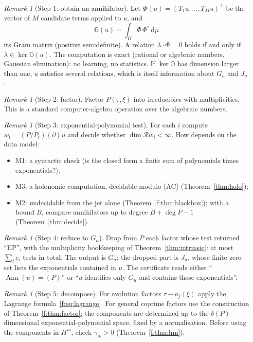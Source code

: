 \documentclass[11pt]{article}
\theoremstyle{plain}
\theoremstyle{definition}
\theoremstyle{remark}
\newtheorem{remark}[theorem]{Remark}
\newcommand{\ring}{\mathcal{R}}            %
\DeclareMathOperator{\Ann}{Ann}             %
\newcommand{\dd}{\,\mathrm{d}}
\DeclareMathOperator{\dimc}{dim}
\newenvironment{aside}[1]{\begin{remark}[#1]}{\end{remark}}
\begin{document}
\begin{aside}{Step 1: obtain an annihilator}
Let $\Phi(u)=(T_1u,\dots,T_Mu)^{\top}$ be the vector of $M$ candidate terms applied to $u$, and
\[
\mathbb G(u)=\int_\Omega\Phi\,\Phi^{*}\dd\mu
\]
its Gram matrix (positive semidefinite). A relation $\lambda\cdot\Phi=0$ holds if and only if $\lambda\in\ker\mathbb G(u)$. The computation is exact (rational or algebraic numbers, Gaussian elimination): no learning, no statistics. If $\ker\mathbb G$ has dimension larger than one, $u$ satisfies several relations, which is itself information about $G_u$ and $J_u$.
\end{aside}

\begin{aside}{Step 2: factor}
Factor $P(\tau,\xi)$ into irreducibles with multiplicities. This is a standard computer-algebra operation over the algebraic numbers.
\end{aside}

\begin{aside}{Step 3: exponential-polynomial test}
For each $i$ compute $w_i=(P/P_i)(\partial)u$ and decide whether $\dimc\ring w_i<\infty$. How depends on the data model:
\begin{itemize}
\item M1: a syntactic check (is the closed form a finite sum of polynomials times exponentials?);
\item M3: a holonomic computation, decidable modulo (AC) (Theorem~\ref{thm:holo});
\item M2: undecidable from the jet alone (Theorem~\ref{f:thm:blackbox}); with a bound $B$, compare annihilators up to degree $B+\deg P-1$ (Theorem~\ref{thm:decide}).
\end{itemize}
\end{aside}

\begin{aside}{Step 4: reduce to $G_u$}
Drop from $P$ each factor whose test returned ``EP'', with the multiplicity bookkeeping of Theorem~\ref{thm:intrinsic}: at most $\sum_ie_i$ tests in total. The output is $G_u$; the dropped part is $J_u$, whose finite zero set lists the exponentials contained in $u$. The certificate reads either ``$\Ann(u)=(P)$'' or ``$u$ identifies only $G_u$ and contains these exponentials''.
\end{aside}

\begin{aside}{Step 5: decompose}
For evolution factors $\tau-a_j(\xi)$ apply the Lagrange formula~\eqref{f:eq:lagrange}. For general coprime factors use the construction of Theorem~\ref{f:thm:factor}; the components are determined up to the $\delta(P)$-dimensional exponential-polynomial space, fixed by a normalisation. Before using the components in $H^m$, check $\gamma_N>0$ (Theorem~\ref{f:thm:hm}).
\end{aside}
\end{document}

